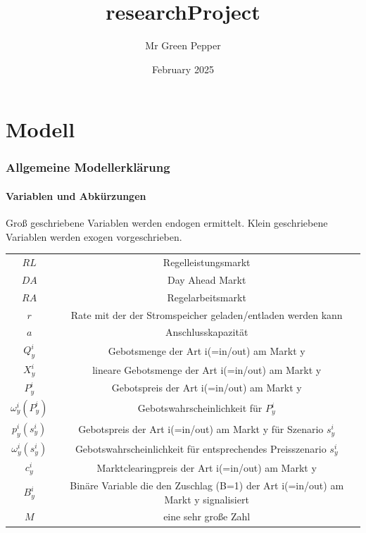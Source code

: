 \documentclass{article}
\title{researchProject}
\author{Mr Green Pepper}
\date{February 2025}
\begin{document}
\listoftodos
\doublespacing
\maketitle

\tableofcontents

\part{Modell}
\section{Allgemeine Modellerklärung}
\subsection{Variablen und Abkürzungen}
Groß geschriebene Variablen werden endogen ermittelt. Klein geschriebene Variablen werden exogen vorgeschrieben.\\

\begin{tabular}{|c|c|}
        $RL$ & Regelleistungsmarkt\\
        $DA$ & Day Ahead Markt \\
        $RA$ & Regelarbeitsmarkt \\
        $r$ & Rate mit der der Stromspeicher geladen/entladen werden kann \\
        $a$ & Anschlusskapazität \\
        $Q^i_{y}$ & Gebotsmenge der Art i(=in/out) am Markt y \\
        $X^i_{y}$ & lineare Gebotsmenge der Art i(=in/out) am Markt y \\
        $P^i_{y}$ & Gebotspreis der Art i(=in/out) am Markt y\\
        $\omega^i_{y}(P^i_{y})$ & Gebotswahrscheinlichkeit für $P^i_{y}$\\
        $p^i_{y}(s^i_y)$ & Gebotspreis der Art i(=in/out) am Markt y für Szenario $s^i_y$\\
        $\omega^i_{y}(s^i_y)$ & Gebotswahrscheinlichkeit für entsprechendes Preisszenario $s^i_y$\\
        $c^i_y$ &  Marktclearingpreis der Art i(=in/out) am Markt y\\
        $B^i_y$ &  Binäre Variable die den Zuschlag (B=1) der Art i(=in/out) am Markt y signalisiert\\
        $M$ &  eine sehr große Zahl\\
    \end{tabular}
\label{tab:my_label}\\
\\
\end{document}
